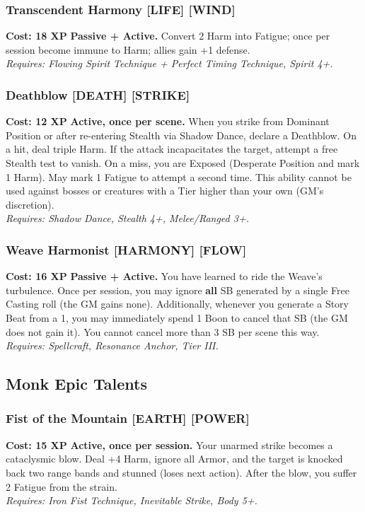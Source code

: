 \subsubsection*{Transcendent Harmony \textnormal{[LIFE] [WIND]}}
\label{talent:transcendent-harmony}
\textbf{Cost: 18 XP} \textbf{Passive + Active.} Convert 2 Harm into Fatigue; once per session become immune to Harm; allies gain +1 defense. \\
\textit{Requires: Flowing Spirit Technique + Perfect Timing Technique, Spirit 4+.}

\subsubsection*{Deathblow \textnormal{[DEATH] [STRIKE]}}
\label{talent:deathblow}
\textbf{Cost: 12 XP} \textbf{Active, once per scene.} When you strike from Dominant Position or after re-entering Stealth via Shadow Dance, declare a Deathblow. On a hit, deal triple Harm. If the attack incapacitates the target, attempt a free Stealth test to vanish. On a miss, you are Exposed (Desperate Position and mark 1 Harm). May mark 1 Fatigue to attempt a second time. This ability cannot be used against bosses or creatures with a Tier higher than your own (GM's discretion). \\
\textit{Requires: Shadow Dance, Stealth 4+, Melee/Ranged 3+.}

\subsubsection*{Weave Harmonist \textnormal{[HARMONY] [FLOW]}}
\label{talent:weave-harmonist}
\textbf{Cost: 16 XP} \textbf{Passive + Active.} You have learned to ride the Weave's turbulence. Once per session, you may ignore \textbf{all} SB generated by a single Free Casting roll (the GM gains none). Additionally, whenever you generate a Story Beat from a 1, you may immediately spend 1 Boon to cancel that SB (the GM does not gain it). You cannot cancel more than 3 SB per scene this way. \\
\textit{Requires: Spellcraft, Resonance Anchor, Tier III.}

\subsection*{Monk Epic Talents}
\label{sec:epic-monk}

\subsubsection*{Fist of the Mountain \textnormal{[EARTH] [POWER]}}
\label{talent:fist-of-the-mountain}
\textbf{Cost: 15 XP} \textbf{Active, once per session.} Your unarmed strike becomes a cataclysmic blow. Deal +4 Harm, ignore all Armor, and the target is knocked back two range bands and stunned (loses next action). After the blow, you suffer 2 Fatigue from the strain. \\
\textit{Requires: Iron Fist Technique, Inevitable Strike, Body 5+.}

